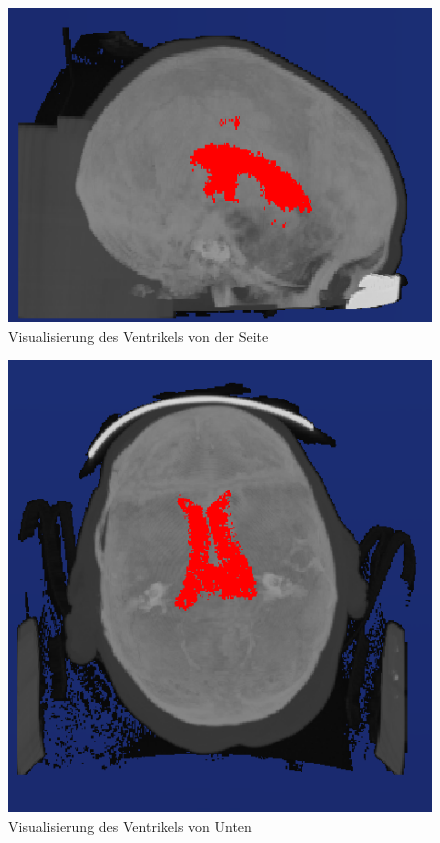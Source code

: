 \begin{figure}[h] 
\centering 
\includegraphics[width=\textwidth/2]{Logos/Seite.PNG}
\caption{Visualisierung des Ventrikels von der Seite} 
\label{fig:ventrikel_seite} 
\end{figure}
\begin{figure}[h] 
\centering 
\includegraphics[width=\textwidth/2]{Logos/Unten.PNG}
\caption{Visualisierung des Ventrikels von Unten} 
\label{fig:ventrikel_unten} 
\end{figure}
